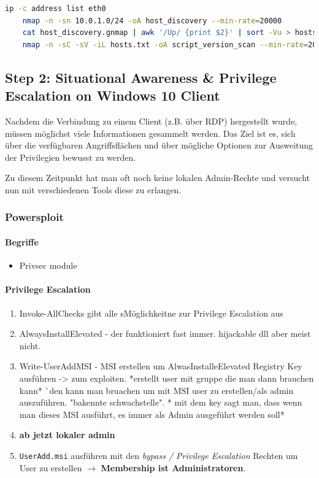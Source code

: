 \begin{lstlisting}[language=bash]
    ip -c address list eth0
    nmap -n -sn 10.0.1.0/24 -oA host_discovery --min-rate=20000
    cat host_discovery.gnmap | awk '/Up/ {print $2}' | sort -Vu > hosts.txt
    nmap -n -sC -sV -iL hosts.txt -oA script_version_scan --min-rate=20000
\end{lstlisting}

\subsection{Step 2: Situational Awareness \& Privilege Escalation on Windows 10 Client}
Nachdem die Verbindung zu einem Client (z.B. über RDP) hergestellt wurde, müssen möglichst viele Informationen gesammelt werden. Das Ziel ist es, sich über die verfügbaren Angriffsflächen und über mögliche Optionen zur Ausweitung der Privilegien bewusst zu werden.

Zu diesem Zeitpunkt hat man oft noch keine lokalen Admin-Rechte und versucht nun mit verschiedenen Tools diese zu erlangen.

\subsubsection{Powersploit}

\paragraph{Begriffe}

\begin{itemize}
    \item Privsec module
\end{itemize}

\paragraph{Privilege Escalation}
\begin{enumerate}
    \item Invoke-AllChecks gibt alle sMöglichkeitne zur Privilege Escalation aus
    \item AlwaysInstallElevated - der funktioniert fast immer. hijackable dll aber meist nicht.
    \item Write-UserAddMSI - MSI erstellen um AlwasInstalleElevated Registry Key ausführen -> zum exploiten. *erstellt user mit gruppe die man dann brauchen kann*
    ^^ den kann man bruachen um mit MSI user zu erstellen/als admin auszuführen. "bakennte schwachstelle". * mit dem key sagt man, dass wenn man dieses MSI ausführt, es immer als Admin ausgeführt werden soll* 
    \item \textbf{ab jetzt lokaler admin}
    \item \lstinline|UserAdd.msi| ausführen mit den \textit{bypass / Privilege Escalation} Rechten um User zu erstellen $\rightarrow$ \textbf{Membership ist Administratoren}.
\end{enumerate}

